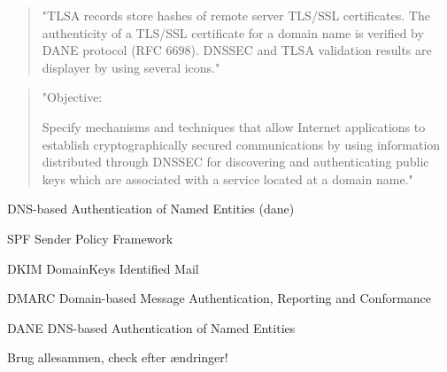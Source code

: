 \documentclass[Screen16to9,17pt]{foils}
\begin{document}


\begin{quote}
"TLSA records store hashes of remote server TLS/SSL certificates. The authenticity of a TLS/SSL certificate for a domain name is verified by DANE protocol (RFC 6698). DNSSEC and TLSA validation results are displayer by using several icons."
\end{quote}



\begin{quote}
"Objective:

Specify mechanisms and techniques that allow Internet applications to
establish cryptographically secured communications by using information
distributed through DNSSEC for discovering and authenticating public
keys which are associated with a service located at a domain name."
\end{quote}

\begin{list1}
\item DNS-based Authentication of Named Entities (dane)
\end{list1}


\begin{list2}
\item SPF Sender Policy Framework\\ {\footnotesize{}}
\item DKIM DomainKeys Identified Mail\\
{\footnotesize{}}
\item DMARC Domain-based Message Authentication, Reporting and Conformance\\
{\footnotesize{}}
\item DANE DNS-based Authentication of Named Entities\\ {\footnotesize{}}
\item Brug allesammen, check efter ændringer!
\end{list2}





\end{document}
